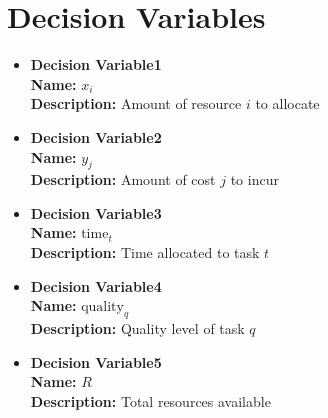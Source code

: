 \documentclass{article}
\begin{document}
\section{Decision Variables}
\begin{itemize}
    \item \textbf{Decision Variable1} \\
    \textbf{Name:} $x_i$ \\
    \textbf{Description:} Amount of resource $i$ to allocate

    \item \textbf{Decision Variable2} \\
    \textbf{Name:} $y_j$ \\
    \textbf{Description:} Amount of cost $j$ to incur

    \item \textbf{Decision Variable3} \\
    \textbf{Name:} $\text{time}_t$ \\
    \textbf{Description:} Time allocated to task $t$

    \item \textbf{Decision Variable4} \\
    \textbf{Name:} $\text{quality}_q$ \\
    \textbf{Description:} Quality level of task $q$

    \item \textbf{Decision Variable5} \\
    \textbf{Name:} $R$ \\
    \textbf{Description:} Total resources available
\end{itemize}
\end{document}
